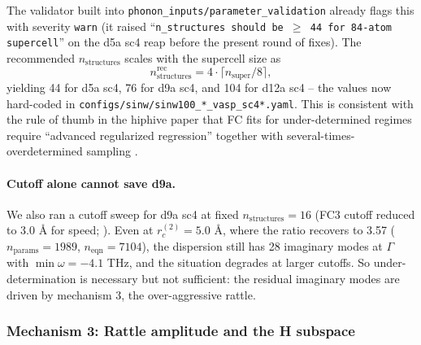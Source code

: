 The validator built into \texttt{phonon\_inputs/parameter\_validation}
already flags this with severity \texttt{warn} (it raised
``\texttt{n\_structures should be $\geq$ 44 for 84-atom supercell}'' on
the d5a sc4 reap before the present round of fixes).  The recommended
$n_\mathrm{structures}$ scales with the supercell size as
\begin{equation}\label{eq:nstruct_recommendation}
  n_\mathrm{structures}^\mathrm{rec}
  = 4 \cdot \bigl\lceil n_\mathrm{super}/8 \bigr\rceil,
\end{equation}
yielding 44 for d5a sc4, 76 for d9a sc4, and 104 for d12a sc4 -- the
values now hard-coded in
\texttt{configs/sinw/sinw100\_*\_vasp\_sc4*.yaml}.  This is consistent
with the rule of thumb in the hiphive paper that FC fits for
under-determined regimes require ``advanced regularized regression''
together with several-times-over\-determined sampling
\cite{eriksson_hiphive_2019}.

\paragraph{Cutoff alone cannot save d9a.}
We also ran a cutoff sweep for d9a sc4 at fixed
$n_\mathrm{structures}=16$ (FC3 cutoff reduced to 3.0 Å for speed;
).  Even at
$r_c^{(2)}=5.0$ Å, where the ratio recovers to 3.57 ($n_\mathrm{params}=1989$,
$n_\mathrm{eqn}=7104$), the dispersion still has 28 imaginary modes at
$\Gamma$ with $\min\omega = -4.1$ THz, and the situation degrades at
larger cutoffs.  So under-determination is necessary but not
sufficient: the residual imaginary modes are driven by mechanism 3,
the over-aggressive rattle.

\subsubsection{Mechanism 3: Rattle amplitude and the H subspace}
\label{sec:rattle_amplitude}

